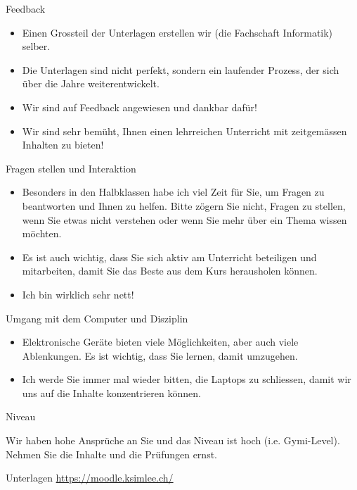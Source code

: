 \begin{frame}[fragile]{Feedback}
	\begin{itemize}
		\item Einen Grossteil der Unterlagen erstellen wir (die Fachschaft Informatik) selber.
		\item Die Unterlagen sind nicht perfekt, sondern ein laufender Prozess, der sich über die Jahre weiterentwickelt.
		\item Wir sind auf Feedback angewiesen und dankbar dafür!
		\item Wir sind sehr bemüht, Ihnen einen lehrreichen Unterricht mit zeitgemässen Inhalten zu bieten!
	\end{itemize}
\end{frame}

\begin{frame}[fragile]{Fragen stellen und Interaktion}
	\begin{itemize}
		\item Besonders in den Halbklassen habe ich viel Zeit für Sie, um Fragen zu beantworten und Ihnen zu helfen. Bitte zögern Sie nicht, Fragen zu stellen, wenn Sie etwas nicht verstehen oder wenn Sie mehr über ein Thema wissen möchten.
		\item Es ist auch wichtig, dass Sie sich aktiv am Unterricht beteiligen und mitarbeiten, damit Sie das Beste aus dem Kurs herausholen können.
		\item Ich bin wirklich sehr nett! 
	\end{itemize}
\end{frame}

\begin{frame}[fragile]{Umgang mit dem Computer und Disziplin}
	\begin{itemize}
		\item Elektronische Geräte bieten viele Möglichkeiten, aber auch viele Ablenkungen. Es ist wichtig, dass Sie lernen, damit umzugehen.
		\item Ich werde Sie immer mal wieder bitten, die Laptops zu schliessen, damit wir uns auf die Inhalte konzentrieren können.
	\end{itemize}
\end{frame}

\begin{frame}[fragile]{Niveau}
	\begin{mycaution}
		Wir haben hohe Ansprüche an Sie und das Niveau ist hoch (i.e. Gymi-Level). Nehmen Sie die Inhalte und die Prüfungen ernst.
	\end{mycaution}
\end{frame}

\begin{frame}[fragile]{Unterlagen}
	\url{https://moodle.ksimlee.ch/}
\end{frame}
